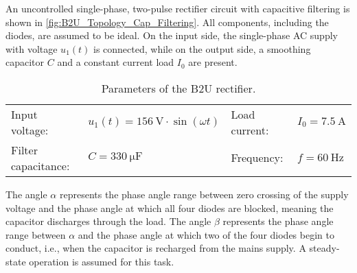 
An uncontrolled single-phase, two-pulse rectifier circuit with capacitive filtering 
is shown in \autoref{fig:B2U_Topology_Cap_Filtering}.
All components, including the diodes, are assumed to be ideal. On the input side, 
the single-phase AC supply with voltage $u_\mathrm{1}(t)$ is connected, while on the output side, 
a smoothing capacitor $C$ and a constant current load $I_\mathrm{0}$ are present.



\begin{table}[ht]
    \centering  %
    \begin{tabular}{llll}
        \toprule
        
        Input voltage: &  $u_\mathrm{1}(t) = \SI{156}{\volt}\cdot \sin(\omega t)$ & Load current: & $I_{\mathrm{0}} = \SI{7.5}{\ampere}$ \\ 
        Filter capacitance: & $C = \SI{330}{\micro\farad}$  & Frequency: & $f= \SI{60}{\hertz}$ \\ 
        \bottomrule
    \end{tabular}
    \caption{Parameters of the B2U rectifier.}  
    \label{table:ex05_Parameters of the circuit}
\end{table}

The angle $\alpha$ represents the phase angle range between zero crossing of the supply voltage and the phase angle
at which all four diodes are blocked, meaning the capacitor discharges through the load. The angle $\beta$ 
represents the phase angle range between $\alpha$ and the phase angle at which two of the four diodes begin to 
conduct, i.e., when the capacitor is recharged from the mains supply.
A steady-state operation is assumed for this task.

